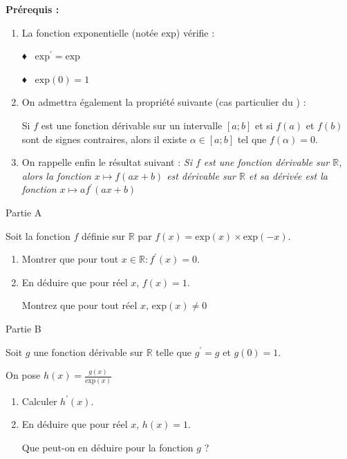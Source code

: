 
%
\textbf{Prérequis : }
\begin{enumerate}
     \item
     La fonction exponentielle (notée $\text{exp}$) vérifie :
     \par
     ♦  $\text{exp}^{\prime}=\text{exp}$
     \par
     ♦  $\text{exp}\left(0\right)=1$
     \item
     On admettra également la propriété suivante (cas particulier du ) :
     \par
     Si $f$ est une fonction dérivable sur un intervalle $\left[a ; b\right]$ et si $f\left(a\right)$ et $f\left(b\right)$ sont de signes contraires, alors il existe $\alpha  \in  \left[a ; b\right]$ tel que $f\left(\alpha \right)=0$.
     \item
     On rappelle enfin le résultat suivant :
     \textit{Si $f$ est une fonction dérivable sur $\mathbb{R}$, alors la fonction $x\mapsto f\left(ax+b\right)$ est dérivable sur $\mathbb{R}$ et sa dérivée est la fonction $x\mapsto af^{\prime}\left(ax+b\right)$}
\end{enumerate}
\begin{h3}Partie A \end{h3}
Soit la fonction $f$ définie sur $\mathbb{R}$ par $f\left(x\right)=\text{exp}\left(x\right)\times \text{exp}\left(-x\right)$.
\begin{enumerate}
     \item
     Montrer que pour tout $x \in  \mathbb{R} : f^{\prime}\left(x\right)=0$.
     \item
     En déduire que pour réel $x$, $f\left(x\right)=1$.
     \par
     Montrez que pour tout réel $x$, $\text{exp}\left(x\right)\neq 0$
\end{enumerate}
\begin{h3}Partie B \end{h3}
Soit $g$ une fonction dérivable sur $\mathbb{R}$ telle que $g^{\prime}=g$ et $g\left(0\right)=1$.
\par
On pose $h\left(x\right)=\frac{g\left(x\right)}{\text{exp}\left(x\right)}$
\begin{enumerate}
     \item
     Calculer $h^{\prime}\left(x\right)$.
     \item
     En déduire que pour réel $x$, $h\left(x\right)=1$.
     \par
     Que peut-on en déduire pour la fonction $g$ ?
\end{enumerate}
